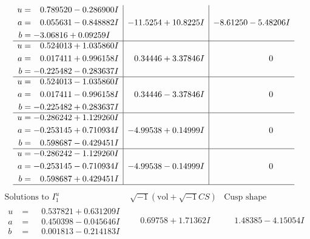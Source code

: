 \documentclass[1p]{elsarticle_modified}
\theoremstyle{definition}
\newcommand{\I}{\sqrt{-1}}
\begin{document}
$$\begin{array}{c|c|c}
\begin{aligned}
u &= \phantom{-}0.789520 - 0.286900 I \\
a &= \phantom{-}0.055631 - 0.848882 I \\
b &= -3.06816 + 0.09259 I\end{aligned}
 & -11.5254 + 10.8225 I & -8.61250 - 5.48206 I \\ \hline\begin{aligned}
u &= \phantom{-}0.524013 + 1.035860 I \\
a &= \phantom{-}0.017411 + 0.996158 I \\
b &= -0.225482 - 0.283637 I\end{aligned}
 & \phantom{-}0.34446 + 3.37846 I & \phantom{-0.000000 } 0 \\ \hline\begin{aligned}
u &= \phantom{-}0.524013 - 1.035860 I \\
a &= \phantom{-}0.017411 - 0.996158 I \\
b &= -0.225482 + 0.283637 I\end{aligned}
 & \phantom{-}0.34446 - 3.37846 I & \phantom{-0.000000 } 0 \\ \hline\begin{aligned}
u &= -0.286242 + 1.129260 I \\
a &= -0.253145 + 0.710934 I \\
b &= \phantom{-}0.598687 - 0.429451 I\end{aligned}
 & -4.99538 + 0.14999 I & \phantom{-0.000000 } 0 \\ \hline\begin{aligned}
u &= -0.286242 - 1.129260 I \\
a &= -0.253145 - 0.710934 I \\
b &= \phantom{-}0.598687 + 0.429451 I\end{aligned}
 & -4.99538 - 0.14999 I & \phantom{-0.000000 } 0\\
 \hline 
 \end{array}$$\newpage$$\begin{array}{c|c|c}  
\text{Solutions to }I^u_{1}& \I (\text{vol} + \sqrt{-1}CS) & \text{Cusp shape}\\
 \hline 
\begin{aligned}
u &= \phantom{-}0.537821 + 0.631209 I \\
a &= \phantom{-}0.450398 - 0.045646 I \\
b &= \phantom{-}0.001813 - 0.214183 I\end{aligned}
 & \phantom{-}0.69758 + 1.71362 I & \phantom{-}1.48385 - 4.15054 I \\ \hline\begin{aligned}

\end{aligned}
\end{array}$$
\end{document}
